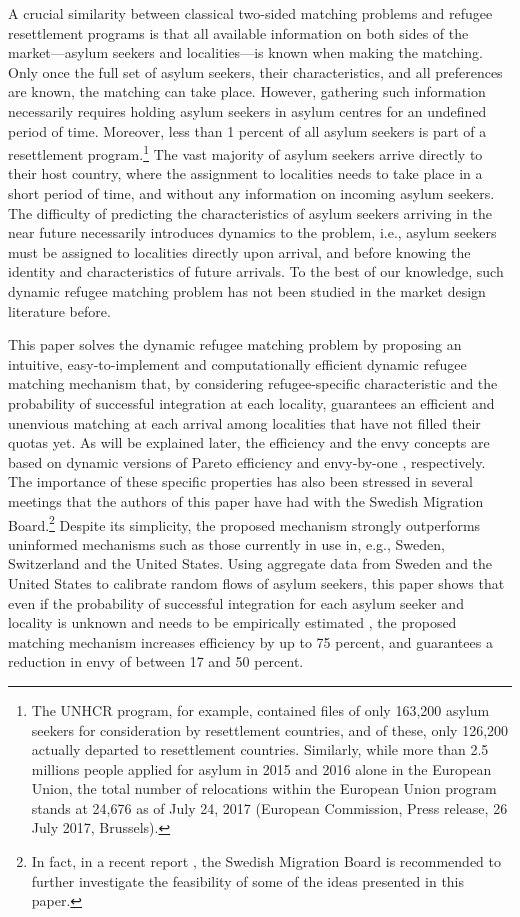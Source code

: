 \documentclass[12pt,fleqn]{article}
\begin{document}
A crucial similarity between classical two-sided matching problems and refugee resettlement programs is that all available information on both sides of the market---asylum seekers and localities---is known when making the matching. Only once the full set of asylum seekers, their characteristics, and all preferences are known, the matching can take place. However, gathering such information necessarily requires holding asylum seekers in asylum centres for an undefined period of time. Moreover, less than 1 percent of all asylum seekers is part of a resettlement program.\footnote{The UNHCR program, for example, contained files of only 163,200 asylum seekers for consideration by resettlement countries, and of these, only 126,200 actually departed to resettlement countries. Similarly, while more than 2.5 millions people applied for asylum in 2015 and 2016 alone in the European Union, the total number of relocations within the European Union program stands at 24,676 as of July 24, 2017 (European Commission, Press release, 26 July 2017, Brussels).} The vast majority of asylum seekers arrive directly to their host country, where the assignment to localities needs to take place in a short period of time, and without any information on incoming asylum seekers. The difficulty of predicting the characteristics of asylum seekers arriving in the near future necessarily introduces dynamics to the problem, i.e., asylum seekers must be assigned to localities directly upon arrival, and before knowing the identity and characteristics of future arrivals. To the best of our knowledge, such dynamic refugee matching problem has not been studied in the market design literature before.

This paper solves the dynamic refugee matching problem by proposing an intuitive, easy-to-implement and computationally efficient dynamic refugee matching mechanism that, by considering refugee-specific characteristic and the probability of successful integration at each locality, guarantees an efficient and unenvious matching at each arrival among localities that have not filled their quotas yet. As will be explained later, the efficiency and the envy concepts are based on dynamic versions of Pareto efficiency and envy-by-one \citep{bib:Budish}, respectively. The importance of these specific properties has also been stressed in several meetings that the authors of this paper have had with the Swedish Migration Board.\footnote{In fact, in a recent report \citep[Swedish Government,][]{SOU2018}, the Swedish Migration Board is recommended to further investigate the feasibility of some of the ideas presented in this paper.} Despite its simplicity, the proposed mechanism strongly outperforms uninformed mechanisms such as those currently in use in, e.g., Sweden, Switzerland and the United States. Using aggregate data from Sweden and the United States to calibrate random flows of asylum seekers, this paper shows that even if the probability of successful integration for each asylum seeker and locality is unknown and needs to be empirically estimated \citep[as in][]{bib:BansakEtAl}, the proposed matching mechanism increases efficiency by up to 75 percent, and guarantees a reduction in envy of between 17 and 50 percent.
\end{document}
